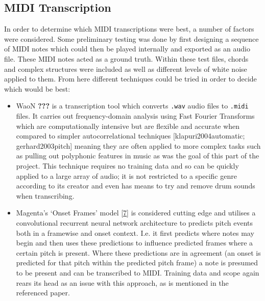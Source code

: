 \documentclass[12pt,]{article}
\providecommand{\tightlist}{%
  \setlength{\itemsep}{0pt}\setlength{\parskip}{0pt}}
\begin{document}
\hypertarget{midi-transcription}{%
\subsection{MIDI Transcription}\label{midi-transcription}}

In order to determine which MIDI transcriptions were best, a number of
factors were considered. Some preliminary testing was done by first
designing a sequence of MIDI notes which could then be played internally
and exported as an audio file. These MIDI notes acted as a ground truth.
Within these test files, chords and complex structures were included as
well as different levels of white noise applied to them. From here
different techniques could be tried in order to decide which would be
best:

\begin{itemize}
\tightlist
\item
  WaoN {\textbf{???}} is a transcription tool which converts
  \texttt{.wav} audio files to \texttt{.midi} files. It carries out
  frequency-domain analysis using Fast Fourier Transforms which are
  computationally intensive but are flexible and accurate when compared
  to simpler autocorrelational techniques {[}klapuri2004automatic;
  gerhard2003pitch{]} meaning they are often applied to more complex
  tasks such as pulling out polyphonic features in music as was the goal
  of this part of the project. This technique requires no training data
  and so can be quickly applied to a large array of audio; it is not
  restricted to a specific genre according to its creator and even has
  means to try and remove drum sounds when transcribing.
\item
  Magenta's `Onset Frames' model
  {[}\protect\hyperlink{ref-magentaonsetframes}{7}{]} is considered
  cutting edge and utilises a convolutional recurrent neural network
  architecture to predicts pitch events both in a framewise and onset
  context. I.e. it first predicts where notes may begin and then uses
  these predictions to influence predicted frames where a certain pitch
  is present. Where these predictions are in agreement (an onset is
  predicted for that pitch within the predicted pitch frame) a note is
  presumed to be present and can be transcribed to MIDI. Training data
  and scope again rears its head as an issue with this approach, as is
  mentioned in the referenced paper.
\end{itemize}
\end{document}
